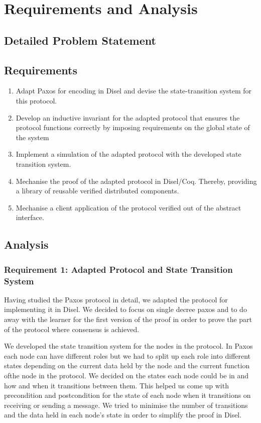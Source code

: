 \chapter{Requirements and Analysis}

\section{Detailed Problem Statement}

\section{Requirements}
\begin{enumerate}
  \item Adapt Paxos for encoding in Disel and devise the state-transition system for this protocol.
  \item Develop an inductive invariant for the adapted protocol that
    ensures the protocol functions correctly by imposing requirements on the global state of the system
  \item Implement a simulation of the adapted protocol with the developed state transition system.
  \item Mechanise the proof of the adapted protocol in Disel/Coq.
    Thereby, providing a library of reusable verified distributed components.
  \item Mechanise a client application of the protocol verified out of the abstract interface.
\end{enumerate}

\section{Analysis}
\subsection{Requirement 1: Adapted Protocol and State Transition System}
Having studied the Paxos protocol in detail, we adapted the protocol for
implementing it in Disel. We decided to focus on single decree paxos and to do
away with the learner for the first version of the proof in order to prove the
part of the protocol where consensus is achieved.

We developed the state transition system for the nodes in the protocol. In Paxos
each node can have different roles but we had to split up each role into different
states depending on the current data held by the node and the current function
ofthe node in the protocol. We decided on the states each node could be in and
how and when it transitions between them. This helped us come up with precondition
and postcondition for the state of each node when it transitions on receiving or
sending a message. We tried to minimise the number of transitions and the data
held in each node’s state in order to simplify the proof in Disel.

